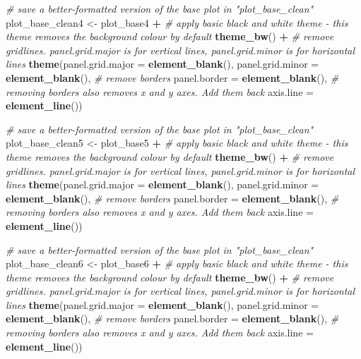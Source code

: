 \documentclass[
]{article}
\newenvironment{Shaded}{\begin{snugshade}}{\end{snugshade}}
\newcommand{\CommentTok}[1]{\textcolor[rgb]{0.56,0.35,0.01}{\textit{#1}}}
\newcommand{\DataTypeTok}[1]{\textcolor[rgb]{0.13,0.29,0.53}{#1}}
\newcommand{\KeywordTok}[1]{\textcolor[rgb]{0.13,0.29,0.53}{\textbf{#1}}}
\newcommand{\NormalTok}[1]{#1}
\newcommand{\OperatorTok}[1]{\textcolor[rgb]{0.81,0.36,0.00}{\textbf{#1}}}
\newcommand{\StringTok}[1]{\textcolor[rgb]{0.31,0.60,0.02}{#1}}
\begin{document}
\begin{Shaded}
\begin{Highlighting}[]
 \CommentTok{# save a better-formatted version of the base plot in "plot_base_clean"}
\NormalTok{ plot_base_clean4 <-}\StringTok{ }\NormalTok{plot_base4 }\OperatorTok{+}\StringTok{ }
\StringTok{   }\CommentTok{# apply basic black and white theme - this theme removes the background colour by default}
\StringTok{   }\KeywordTok{theme_bw}\NormalTok{() }\OperatorTok{+}\StringTok{ }
\StringTok{   }\CommentTok{# remove gridlines. panel.grid.major is for vertical lines, panel.grid.minor is for horizontal lines}
\StringTok{   }\KeywordTok{theme}\NormalTok{(}\DataTypeTok{panel.grid.major =} \KeywordTok{element_blank}\NormalTok{(), }\DataTypeTok{panel.grid.minor =} \KeywordTok{element_blank}\NormalTok{(),}
         \CommentTok{# remove borders}
         \DataTypeTok{panel.border =} \KeywordTok{element_blank}\NormalTok{(),}
         \CommentTok{# removing borders also removes x and y axes. Add them back}
         \DataTypeTok{axis.line =} \KeywordTok{element_line}\NormalTok{())}
 

 \CommentTok{# save a better-formatted version of the base plot in "plot_base_clean"}
\NormalTok{ plot_base_clean5 <-}\StringTok{ }\NormalTok{plot_base5 }\OperatorTok{+}\StringTok{ }
\StringTok{   }\CommentTok{# apply basic black and white theme - this theme removes the background colour by default}
\StringTok{   }\KeywordTok{theme_bw}\NormalTok{() }\OperatorTok{+}\StringTok{ }
\StringTok{   }\CommentTok{# remove gridlines. panel.grid.major is for vertical lines, panel.grid.minor is for horizontal lines}
\StringTok{   }\KeywordTok{theme}\NormalTok{(}\DataTypeTok{panel.grid.major =} \KeywordTok{element_blank}\NormalTok{(), }\DataTypeTok{panel.grid.minor =} \KeywordTok{element_blank}\NormalTok{(),}
         \CommentTok{# remove borders}
         \DataTypeTok{panel.border =} \KeywordTok{element_blank}\NormalTok{(),}
         \CommentTok{# removing borders also removes x and y axes. Add them back}
         \DataTypeTok{axis.line =} \KeywordTok{element_line}\NormalTok{())}

 
 \CommentTok{# save a better-formatted version of the base plot in "plot_base_clean"}
\NormalTok{ plot_base_clean6 <-}\StringTok{ }\NormalTok{plot_base6 }\OperatorTok{+}\StringTok{ }
\StringTok{   }\CommentTok{# apply basic black and white theme - this theme removes the background colour by default}
\StringTok{   }\KeywordTok{theme_bw}\NormalTok{() }\OperatorTok{+}\StringTok{ }
\StringTok{   }\CommentTok{# remove gridlines. panel.grid.major is for vertical lines, panel.grid.minor is for horizontal lines}
\StringTok{   }\KeywordTok{theme}\NormalTok{(}\DataTypeTok{panel.grid.major =} \KeywordTok{element_blank}\NormalTok{(), }\DataTypeTok{panel.grid.minor =} \KeywordTok{element_blank}\NormalTok{(),}
         \CommentTok{# remove borders}
         \DataTypeTok{panel.border =} \KeywordTok{element_blank}\NormalTok{(),}
         \CommentTok{# removing borders also removes x and y axes. Add them back}
         \DataTypeTok{axis.line =} \KeywordTok{element_line}\NormalTok{())}


\end{Highlighting}
\end{Shaded}
\end{document}
